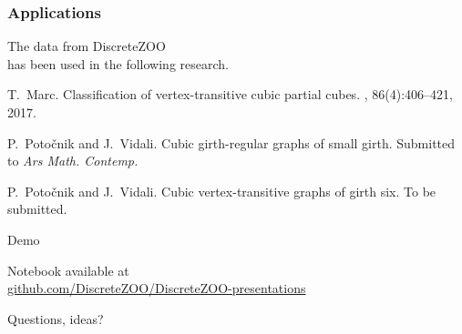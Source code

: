 \documentclass[usepdftitle=false]{beamer}
\newcommand{\con}[1]{\textcolor{zoored}{#1}}
\begin{document}
\frame
{
    \frametitle{Applications}

    The data from \con{DiscreteZOO} \\
    has been used in the following research.

    \medskip

    \begin{thebibliography}{2}
     T.~Marc.
    \newblock Classification of vertex-transitive cubic partial cubes.
    , 86(4):406--421, 2017.

     P.~Potočnik and J.~Vidali.
    \newblock Cubic girth-regular graphs of small girth.
    \newblock Submitted to {\em Ars Math. Contemp.}

     P.~Potočnik and J.~Vidali.
    \newblock Cubic vertex-transitive graphs of girth six.
    \newblock To be submitted.
    \end{thebibliography}

}

\frame
{
\begin{center}
\huge
\con{Demo} \\

\bigskip
\bigskip

{\large
Notebook available at \\
\con{\href{https://github.com/DiscreteZOO/DiscreteZOO-presentations}{github.com/DiscreteZOO/DiscreteZOO-presentations}}
}
\end{center}
}


\frame
{
\begin{center}
\huge
\con{Questions, ideas?}
\end{center}
}
\end{document}
